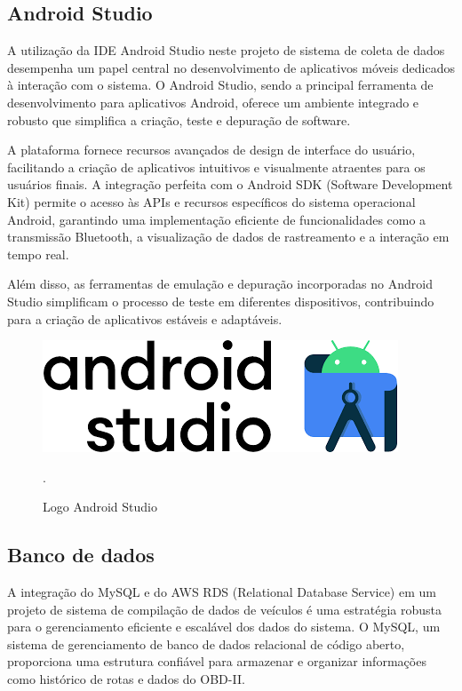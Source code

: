     \subsection{Android Studio} A utilização da IDE Android Studio neste projeto de sistema de coleta de dados desempenha um papel central no desenvolvimento de aplicativos móveis dedicados à interação com o sistema. O Android Studio, sendo a principal ferramenta de desenvolvimento para aplicativos Android, oferece um ambiente integrado e robusto que simplifica a criação, teste e depuração de software. 
    
    A plataforma fornece recursos avançados de design de interface do usuário, facilitando a criação de aplicativos intuitivos e visualmente atraentes para os usuários finais. A integração perfeita com o Android SDK (Software Development Kit) permite o acesso às APIs e recursos específicos do sistema operacional Android, garantindo uma implementação eficiente de funcionalidades como a transmissão Bluetooth, a visualização de dados de rastreamento e a interação em tempo real. 
    
    Além disso, as ferramentas de emulação e depuração incorporadas no Android Studio simplificam o processo de teste em diferentes dispositivos, contribuindo para a criação de aplicativos estáveis e adaptáveis.

     \begin{figure}[hp]
    \centering
    
    \includegraphics[scale=0.4]{figures/logo_android.png}
    
    \caption{Logo Android Studio}.
    
\end{figure}
    
     \subsection{Banco de dados} A integração do MySQL e do AWS RDS (Relational Database Service) em um projeto de sistema de compilação de dados de veículos é uma estratégia robusta para o gerenciamento eficiente e escalável dos dados do sistema. O MySQL, um sistema de gerenciamento de banco de dados relacional de código aberto, proporciona uma estrutura confiável para armazenar e organizar informações como histórico de rotas e dados do OBD-II. 
     
